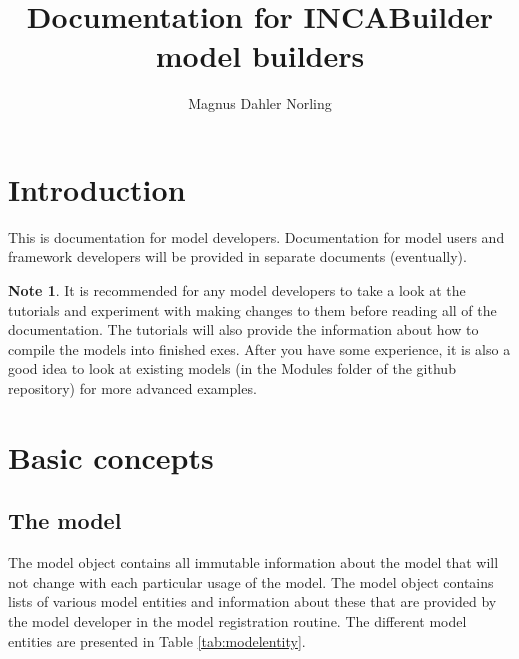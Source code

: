 \documentclass[11pt]{article}
\title{Documentation for INCABuilder model builders}
\author{Magnus Dahler Norling}
\theoremstyle{definition}
\newtheorem{mynote}{Note}
\newenvironment{note}%
  {\begin{lrbox}{\notebox}%
   \begin{minipage}{\dimexpr\linewidth-2\fboxsep}
   \begin{mynote}}%
  {\end{mynote}%
   \end{minipage}%
   \end{lrbox}%
   \begin{trivlist}
     \item[]\colorbox{silver}{\usebox\notebox}
   \end{trivlist}}
\begin{document}
\maketitle

\tableofcontents

\section{Introduction}
This is documentation for model developers. Documentation for model users and framework developers will be provided in separate documents (eventually).

\begin{note}
It is recommended for any model developers to take a look at the tutorials and experiment with making changes to them before reading all of the documentation. The tutorials will also provide the information about how to compile the models into finished exes. After you have some experience, it is also a good idea to look at existing models (in the Modules folder of the github repository) for more advanced examples.
\end{note}

\section{Basic concepts}

\subsection{The model}

The model object contains all immutable information about the model that will not change with each particular usage of the model. The model object contains lists of various model entities and information about these that are provided by the model developer in the model registration routine. The different model entities are presented in Table \ref{tab:modelentity}.
\end{document}
